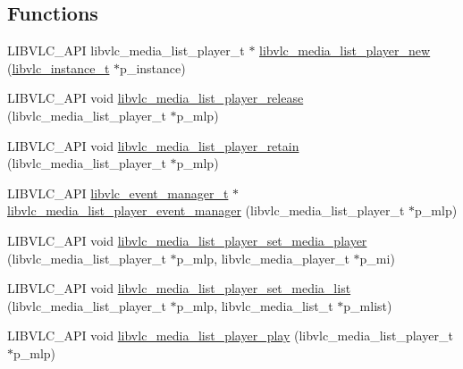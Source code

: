 \subsection*{Functions}
\begin{DoxyCompactItemize}
\item 
L\+I\+B\+V\+L\+C\+\_\+\+A\+PI libvlc\+\_\+media\+\_\+list\+\_\+player\+\_\+t $\ast$ \hyperlink{group__libvlc__media__list__player_ga9db1d492204698de525e138c1ddc531d}{libvlc\+\_\+media\+\_\+list\+\_\+player\+\_\+new} (\hyperlink{group__libvlc__core_ga316d739a80da4678206c79f4d6c2e284}{libvlc\+\_\+instance\+\_\+t} $\ast$p\+\_\+instance)
\item 
L\+I\+B\+V\+L\+C\+\_\+\+A\+PI void \hyperlink{group__libvlc__media__list__player_ga50768b609de18646d8339c31bd57d41d}{libvlc\+\_\+media\+\_\+list\+\_\+player\+\_\+release} (libvlc\+\_\+media\+\_\+list\+\_\+player\+\_\+t $\ast$p\+\_\+mlp)
\item 
L\+I\+B\+V\+L\+C\+\_\+\+A\+PI void \hyperlink{group__libvlc__media__list__player_ga322f8fd8487aef71d0d914ca57e59bf6}{libvlc\+\_\+media\+\_\+list\+\_\+player\+\_\+retain} (libvlc\+\_\+media\+\_\+list\+\_\+player\+\_\+t $\ast$p\+\_\+mlp)
\item 
L\+I\+B\+V\+L\+C\+\_\+\+A\+PI \hyperlink{group__libvlc__event_gaa82f247503d3558b9117550e8d3c9259}{libvlc\+\_\+event\+\_\+manager\+\_\+t} $\ast$ \hyperlink{group__libvlc__media__list__player_gaa1db515ea843cfb5f9ef9c69cc6133b6}{libvlc\+\_\+media\+\_\+list\+\_\+player\+\_\+event\+\_\+manager} (libvlc\+\_\+media\+\_\+list\+\_\+player\+\_\+t $\ast$p\+\_\+mlp)
\item 
L\+I\+B\+V\+L\+C\+\_\+\+A\+PI void \hyperlink{group__libvlc__media__list__player_ga64b89e6639ac62c5cd7875050d2fabc8}{libvlc\+\_\+media\+\_\+list\+\_\+player\+\_\+set\+\_\+media\+\_\+player} (libvlc\+\_\+media\+\_\+list\+\_\+player\+\_\+t $\ast$p\+\_\+mlp, libvlc\+\_\+media\+\_\+player\+\_\+t $\ast$p\+\_\+mi)
\item 
L\+I\+B\+V\+L\+C\+\_\+\+A\+PI void \hyperlink{group__libvlc__media__list__player_ga81289f13efd011a195f1728a12e348db}{libvlc\+\_\+media\+\_\+list\+\_\+player\+\_\+set\+\_\+media\+\_\+list} (libvlc\+\_\+media\+\_\+list\+\_\+player\+\_\+t $\ast$p\+\_\+mlp, libvlc\+\_\+media\+\_\+list\+\_\+t $\ast$p\+\_\+mlist)
\item 
L\+I\+B\+V\+L\+C\+\_\+\+A\+PI void \hyperlink{group__libvlc__media__list__player_ga7dea457c92634ff9db3037a054e3fa31}{libvlc\+\_\+media\+\_\+list\+\_\+player\+\_\+play} (libvlc\+\_\+media\+\_\+list\+\_\+player\+\_\+t $\ast$p\+\_\+mlp)
\item 

\end{DoxyCompactItemize}
